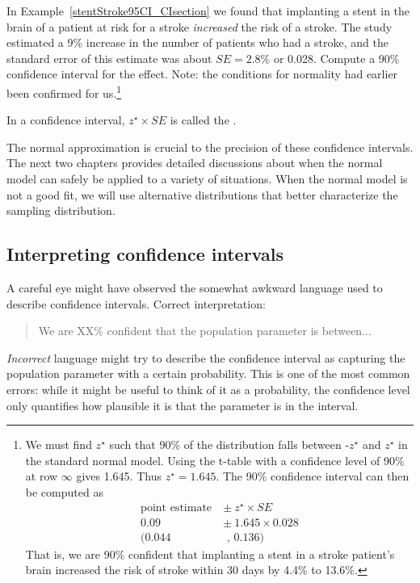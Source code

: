 \begin{exercise} \label{find90CIForRun10AgeExercise}
In Example~\ref{stentStroke95CI_CIsection} we found that implanting a stent in the brain of a patient at risk for a stroke \emph{increased} the risk of a stroke. The study estimated a 9\% increase in the number of patients who had a stroke, and the standard error of this estimate was about $SE = 2.8\%$ or 0.028. Compute a 90\% confidence interval for the effect.  Note: the conditions for normality had earlier been confirmed for us.\footnote{We must find $z^{\star}$ such that 90\% of the distribution falls between -$z^{\star}$ and $z^{\star}$ in the standard normal model.  Using the t-table with a confidence level of 90\% at row $\infty$ gives 1.645.  Thus  $z^{\star}=1.645$. The 90\% confidence interval can then be computed as
\begin{align*}
\text{point estimate}\ &\pm\ z^{\star}\times SE \\
0.09 \ &\pm \ 1.645\times 0.028 \\
(0.044& \text{ , } 0.136)
\end{align*}
That is, we are 90\% confident that implanting a stent in a stroke patient's brain increased the risk of stroke within 30 days by 4.4\% to 13.6\%.}
\end{exercise}


\begin{termBox}{
\label{marginOfErrorTermBox}In a confidence interval, $z^{\star}\times SE$ is called the .}
\end{termBox}

The normal approximation is crucial to the precision of these confidence intervals. The next two chapters provides detailed discussions about when the normal model can safely be applied to a variety of situations. When the normal model is not a good fit, we will use alternative distributions that better characterize the sampling distribution.


\subsection{Interpreting confidence intervals}
\label{interpretingCIs}


A careful eye might have observed the somewhat awkward language used to describe confidence intervals. Correct interpretation:
\begin{quote}
We are XX\% confident that the population parameter is between...
\end{quote}
\emph{Incorrect} language might try to describe the confidence interval as capturing the population parameter with a certain probability. This is one of the most common errors: while it might be useful to think of it as a probability, the confidence level only quantifies how plausible it is that the parameter is in the interval.

